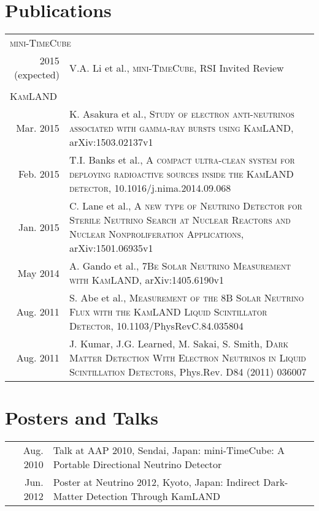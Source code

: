 \documentclass[a4paper,10pt]{article} %
\begin{document}
\section{Publications}

\begin{tabular}{rp{11cm}}
	\multicolumn{2}{l}{\textsc{mini-TimeCube}} \\
	2015 (expected) & V.A. Li et al., \textsc{mini-TimeCube}, RSI Invited Review\\
	\multicolumn{2}{c}{} \\
	\multicolumn{2}{l}{\textsc{KamLAND}} \\
	Mar. 2015 & K. Asakura et al., \textsc{Study of electron anti-neutrinos
	associated with gamma-ray bursts using KamLAND}, arXiv:1503.02137v1\\
	Feb. 2015 & T.I. Banks et al., \textsc{A compact ultra-clean system for
	deploying radioactive sources inside the KamLAND detector},
	10.1016/j.nima.2014.09.068\\
	Jan. 2015 & C. Lane et al., \textsc{A new type of Neutrino Detector for
	Sterile Neutrino Search at Nuclear Reactors and Nuclear Nonproliferation
	Applications}, arXiv:1501.06935v1\\
	May 2014 & A. Gando et al., \textsc{7Be Solar Neutrino Measurement with
	KamLAND}, arXiv:1405.6190v1\\
	Aug. 2011 & S. Abe et al., \textsc{Measurement of the 8B Solar Neutrino
	Flux with the KamLAND Liquid Scintillator Detector},
	10.1103/PhysRevC.84.035804\\
	Aug. 2011 & J. Kumar, J.G. Learned, M. Sakai, S. Smith,
	\textsc{Dark Matter Detection With Electron Neutrinos in Liquid
	Scintillation Detectors}, Phys.Rev. D84 (2011) 036007\\
\end{tabular}


\section{Posters and Talks}
\begin{tabular}{rp{11cm}}
	Aug. 2010 & Talk at AAP 2010, Sendai, Japan: mini-TimeCube: A Portable
	Directional Neutrino Detector\\
	Jun. 2012 & Poster at Neutrino 2012, Kyoto, Japan: Indirect Dark-Matter
	Detection Through KamLAND\\
\end{tabular}
\end{document}
